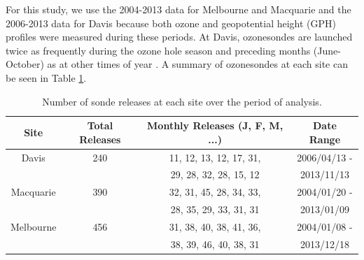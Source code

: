 \documentclass[acp, manuscript]{copernicus} %
\begin{document}
    For this study, we use the 2004-2013 data for Melbourne and Macquarie and the 2006-2013 data for Davis because both ozone and geopotential height (GPH) profiles were measured during these periods.
    At Davis, ozonesondes are launched twice as frequently during the ozone hole season and preceding months (June-October) as at other times of year \citep{Alexander2013}.
    A summary of ozonesondes at each site can be seen in Table \ref{table:sondesummary}.
    
    \begin{table}[t]
      \caption{Number of sonde releases at each site over the period of analysis.}
      \begin{tabular}{ c   c   c   c  } 
	\hline
	Site 		& Total Releases & Monthly Releases (J, F, M, ...) & Date Range \\
	\hline
	Davis		& 240	& 11, 12, 13, 12, 17, 31,	& 2006/04/13 -  \\ 
			&	& 29, 28, 32, 28, 15, 12 	& 2013/11/13	\\
	Macquarie 	& 390	& 32, 31, 45, 28, 34, 33,	& 2004/01/20 -  \\
			&	& 28, 35, 29, 33, 31, 31 	& 2013/01/09	\\ 
	Melbourne 	& 456	& 31, 38, 40, 38, 41, 36,	& 2004/01/08 -  \\
			&	& 38, 39, 46, 40, 38, 31 	& 2013/12/18	\\
	\hline
      \end{tabular}
      \label{table:sondesummary}
    \end{table}
    
\end{document}

